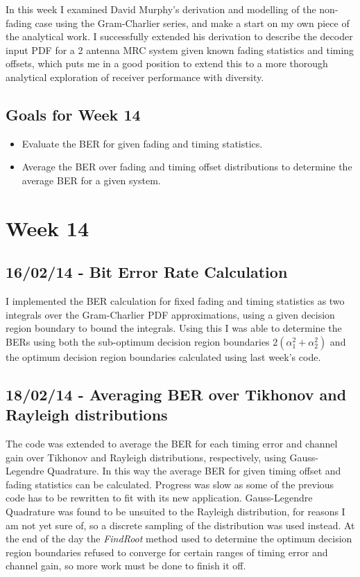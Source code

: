 In this week I examined David Murphy's derivation and modelling of the non-fading
case using the Gram-Charlier series, and make a start on my own piece of
the analytical work. I successfully extended his derivation to describe
the decoder input PDF for a 2 antenna MRC system given known fading
statistics and timing offsets, which puts me in a good position to
extend this to a more thorough analytical exploration of receiver
performance with diversity.

\subsection{Goals for Week 14}

\begin{itemize}
\itemsep1pt\parskip0pt
\item
  Evaluate the BER for given fading and timing statistics.
\item
  Average the BER over fading and timing offset distributions to
  determine the average BER for a given system.
\end{itemize}

\section{Week 14}

\subsection{16/02/14 - Bit Error Rate Calculation}

I implemented the BER calculation for fixed fading and timing statistics
as two integrals over the Gram-Charlier PDF approximations, using a
given decision region boundary to bound the integrals. Using this I was
able to determine the BERs using both the sub-optimum decision region
boundaries $2(\alpha_1^2 + \alpha_2^2)$ and the optimum decision region
boundaries calculated using last week's code.

\subsection{18/02/14 - Averaging BER over Tikhonov and Rayleigh
distributions}

The code was extended to average the BER for each timing error and
channel gain over Tikhonov and Rayleigh distributions, respectively,
using Gauss-Legendre Quadrature. In this way the average BER for given
timing offset and fading statistics can be calculated. Progress was slow
as some of the previous code has to be rewritten to fit with its new
application. Gauss-Legendre Quadrature was found to be unsuited to the
Rayleigh distribution, for reasons I am not yet sure of, so a discrete
sampling of the distribution was used instead. At the end of the day the
\emph{FindRoot} method used to determine the optimum decision region
boundaries refused to converge for certain ranges of timing error and
channel gain, so more work must be done to finish it off.

